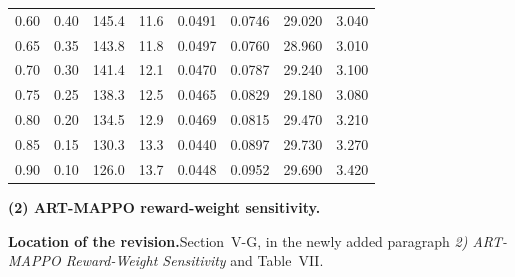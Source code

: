 \documentclass[11pt]{article}
\newcommand{\loc}{\medskip\noindent\textbf{Location of the revision.}\quad}
\begin{document}
\begin{tcolorbox}[enhanced,breakable,colback=white,colframe=addblue!55,
coltext=addblue,fontupper=\color{addblue},boxrule=0.6pt,arc=2pt,
left=9pt,right=9pt,top=7pt,bottom=7pt]
{{\begin{tabular}{@{}cccccccc@{}}
0.60 & 0.40 & 145.4 & 11.6 & 0.0491 & 0.0746 & 29.020 & 3.040 \\
0.65 & 0.35 & 143.8 & 11.8 & 0.0497 & 0.0760 & 28.960 & 3.010 \\
0.70 & 0.30 & 141.4 & 12.1 & 0.0470 & 0.0787 & 29.240 & 3.100 \\
0.75 & 0.25 & 138.3 & 12.5 & 0.0465 & 0.0829 & 29.180 & 3.080 \\
0.80 & 0.20 & 134.5 & 12.9 & 0.0469 & 0.0815 & 29.470 & 3.210 \\
0.85 & 0.15 & 130.3 & 13.3 & 0.0440 & 0.0897 & 29.730 & 3.270 \\
0.90 & 0.10 & 126.0 & 13.7 & 0.0448 & 0.0952 & 29.690 & 3.420 \\
\hline
\end{tabular}
}
\par}
\end{tcolorbox}

\medskip
\noindent\textbf{(2) ART-MAPPO reward-weight sensitivity.}

\loc Section~V-G, in the newly added paragraph
\emph{2) ART-MAPPO Reward-Weight Sensitivity} and Table~VII.
\end{document}
